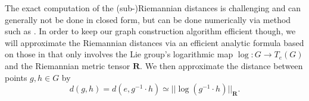 \documentclass{article}
\DeclareMathOperator{\diag}{diag}
\begin{document}
The exact computation of the (sub-)Riemannian distances is challenging and can generally not be done in closed form, but can be done numerically via method such as \citep{bekkers_pde_2015,sanguinetti2015fastmarching,mashtakov2017tracking}. In order to keep our graph construction algorithm efficient though, we will approximate the Riemannian distances via an efficient analytic formula based on those in \citep{bekkers2018nilpotent} that only involves the Lie group's logarithmic map $\log:G \rightarrow T_e(G)$ and the Riemannian metric tensor $\mathbf{R}$. We then approximate the distance between points $g,h \in G$ by 
\begin{equation}
d(g, h) = d(e, g^{-1} \cdot h) \simeq ||\log (g^{-1} \cdot h)||_{\mathbf{R}}.
\end{equation}


\end{document}
